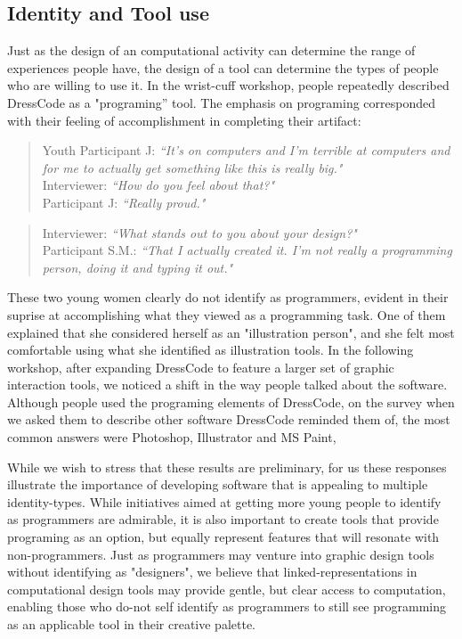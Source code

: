 \documentclass{sigchi}
\begin{document}
\subsection{Identity and Tool use}
Just as the design of an computational activity can determine the range of experiences people have, the design of a tool can determine the types of people who are willing to use it. In the wrist-cuff workshop, people repeatedly described DressCode as a "programing'' tool. The emphasis on programing corresponded with their feeling of accomplishment in completing their artifact:
 \begin{quote}
Youth Participant J: \textit{``It's on computers and I'm terrible at computers and for me to actually get something like this is really big."} 
\\Interviewer: \textit{``How do you feel about that?"}
\\Participant J: \textit{``Really proud."} 
\end{quote}

 \begin{quote}
 Interviewer: \textit{``What stands out to you about your design?"}
 \\Participant S.M.: \textit{``That I actually created it. I'm not really a programming person, doing it and typing it out."}
 \end{quote}

These two young women clearly do not identify as programmers, evident in their suprise at accomplishing what they viewed as a programming task. One of them explained that she considered herself as an "illustration person", and she felt most comfortable using what she identified as illustration tools. In the following workshop, after expanding DressCode to feature a larger set of graphic interaction tools, we noticed a shift in the way people talked about the software. Although people used the programing elements of DressCode, on the survey when we asked them to describe other software DressCode reminded them of, the most common answers were Photoshop, Illustrator and MS Paint, 

While we wish to stress that these results are preliminary, for us these responses illustrate the importance of developing software that is appealing to multiple identity-types. While initiatives aimed at getting more young people to identify as programmers are admirable, it is also important to create tools that provide programing as an option, but equally represent features that will resonate with non-programmers.  Just as programmers may venture into graphic design tools without identifying as "designers", we believe that linked-representations in computational design tools may provide gentle, but clear access to computation, enabling those who do-not self identify as programmers to still see programming as an applicable tool in their creative palette.
\end{document}
